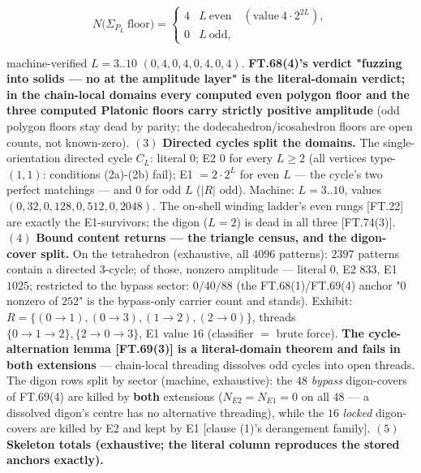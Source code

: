 \begin{theorem}
\[
N\bigl(\Sigma_{P_L}\ \text{floor}\bigr)=\begin{cases}4 & L\ \text{even}\quad(\text{value}\ 4\cdot2^{2L}),\\[2pt] 0 & L\ \text{odd},\end{cases}
\]

machine-verified $L=3..10$ $(0,4,0,4,0,4,0,4)$. \textbf{FT.68(4)'s verdict "fuzzing into solids — no at the amplitude layer" is the literal-domain verdict; in the chain-local domains every computed even polygon floor and the three computed Platonic floors carry strictly positive amplitude} (odd polygon floors stay dead by parity; the dodecahedron/icosahedron floors are open counts, not known-zero). $(3)$ \textbf{Directed cycles split the domains.} The single-orientation directed cycle $C_L$: literal $0$; E2 $0$ for every $L\ge2$ (all vertices type-$(1,1)$: conditions (2a)-(2b) fail); E1 $=2\cdot2^{L}$ for even $L$ — the cycle's two perfect matchings — and $0$ for odd $L$ ($|R|$ odd). Machine: $L=3..10$, values $(0,32,0,128,0,512,0,2048)$. The on-shell winding ladder's even rungs [FT.22] are exactly the E1-survivors; the digon ($L=2$) is dead in all three [FT.74(3)]. $(4)$ \textbf{Bound content returns — the triangle census, and the digon-cover split.} On the tetrahedron (exhaustive, all $4096$ patterns): $2397$ patterns contain a directed $3$-cycle; of those, nonzero amplitude — literal $0$, E2 $833$, E1 $1025$; restricted to the bypass sector: $0/40/88$ (the FT.68(1)/FT.69(4) anchor "$0$ nonzero of $252$" is the bypass-only carrier count and stands). Exhibit: $R=\{(0{\to}1),(0{\to}3),(1{\to}2),(2{\to}0)\}$, threads $\{0{\to}1{\to}2\},\{2{\to}0{\to}3\}$, E1 value $16$ (classifier $=$ brute force). \textbf{The cycle-alternation lemma [FT.69(3)] is a literal-domain theorem and fails in both extensions} — chain-local threading dissolves odd cycles into open threads. The digon rows split by sector (machine, exhaustive): the $48$ \textit{bypass} digon-covers of FT.69(4) are killed by \textbf{both} extensions ($N_{E2}=N_{E1}=0$ on all $48$ — a dissolved digon's centre has no alternative threading), while the $16$ \textit{locked} digon-covers are killed by E2 and kept by E1 [clause (1)'s derangement family]. $(5)$ \textbf{Skeleton totals (exhaustive; the literal column reproduces the stored anchors exactly).}


\end{theorem}
